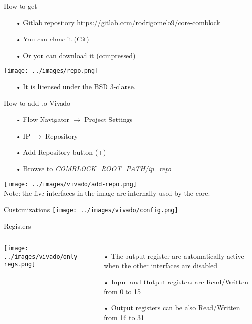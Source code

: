 \documentclass[11pt]{beamer}
\begin{document}
\begin{frame}{How to get}
  \begin{itemize}
    \scriptsize
    \item[•] Gitlab repository \url{https://gitlab.com/rodrigomelo9/core-comblock}
    \item[•] You can clone it (Git)
    \item[•] Or you can download it (compressed)
  \end{itemize}
  \center
  \texttt{[image: ../images/repo.png]}
  \begin{itemize}
    \scriptsize
    \item[•] It is licensed under the BSD 3-clause.
  \end{itemize}
\end{frame}

\begin{frame}{How to add to Vivado}
  \begin{itemize}
    \scriptsize
    \item[•] Flow Navigator $\rightarrow$ Project Settings
    \item[•] IP $\rightarrow$ Repository
    \item[•] Add Repository button (+)
    \item[•] Browse to \textit{COMBLOCK\_ROOT\_PATH/ip\_repo}
  \end{itemize}
  \center
  \texttt{[image: ../images/vivado/add-repo.png]} \\
  \scriptsize
  Note: the five interfaces in the image are internally used by the core.
\end{frame}

\begin{frame}{Customizations}
  \center
  \texttt{[image: ../images/vivado/config.png]}
\end{frame}

\begin{frame}{Registers}
  \begin{columns}
      \center
      \texttt{[image: ../images/vivado/only-regs.png]}
      \begin{itemize}
        \scriptsize
        \item[•] The output register are automatically active when the other interfaces are disabled
        \item[•] Input and Output registers are Read/Written from 0 to 15
        \item[•] Output registers can be also Read/Written from 16 to 31
      \end{itemize}
    \end{columns}
\end{frame}
\end{document}
